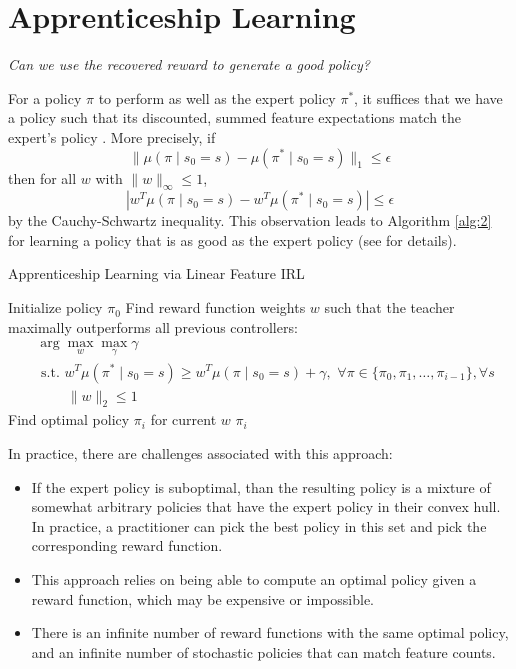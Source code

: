 \documentclass{article}
\begin{document}
\section{Apprenticeship Learning}

{\centering \textit{Can we use the recovered reward to generate a good policy?}\par}

For a policy $\pi$ to perform as well as the expert policy $\pi^*$, it suffices that we have a policy such that its discounted, summed feature expectations match the expert's policy \cite{abbeel}. More precisely, if
\begin{equation}
    \| \mu(\pi \mid s_0 = s) - \mu(\pi^* \mid s_0 = s) \|_1 \leq \epsilon
\end{equation}
then for all $w$ with $\|w\|_\infty \leq 1$,
\begin{equation*}
    |w^T \mu(\pi \mid s_0 = s) - w^T \mu(\pi^* \mid s_0 = s)| \leq \epsilon
\end{equation*}
by the Cauchy-Schwartz inequality. This observation leads to Algorithm \ref{alg:2} for learning a policy that is as good as the expert policy (see \cite{abbeel} for details).

\begin{algorithm}
\caption{Apprenticeship Learning via Linear Feature IRL}\label{alg:2}
\begin{algorithmic}[1]
\State Initialize policy $\pi_0$
\State Find reward function weights $w$ such that the teacher maximally outperforms all previous controllers:  \begin{align*}
    &\arg\max_{w} \max_\gamma \gamma \\
    &\,\,\textrm{s.t.}\,\, w^T \mu(\pi^* \mid s_0 = s) \geq w^T \mu(\pi \mid s_0 = s) + \gamma, \,\, \forall \pi \in \{\pi_0, \pi_1, \ldots, \pi_{i-1}\}, \forall s \\
    &\quad\quad  \, \|w\|_2 \leq 1
\end{align*}
\State Find optimal policy $\pi_i$ for current $w$
\Return $\pi_i$
\EndIf
\EndFor
\end{algorithmic}
\end{algorithm}

In practice, there are challenges associated with this approach:

\begin{itemize}
    \item If the expert policy is suboptimal, than the resulting policy is a mixture of somewhat arbitrary policies that have the expert policy in their convex hull. In practice, a practitioner can pick the best policy in this set and pick the corresponding reward function.
    \item This approach relies on being able to compute an optimal policy given a reward function, which may be expensive or impossible.
    \item There is an infinite number of reward functions with the same optimal policy, and an infinite number of stochastic policies that can match feature counts.
\end{itemize}
\end{document}
